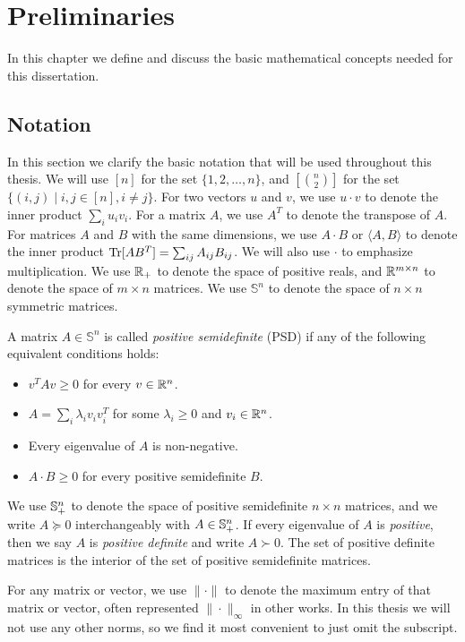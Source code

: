 \chapter{Preliminaries}\label{cha:prelims}
In this chapter we define and discuss the basic mathematical concepts needed for this dissertation.

\section{Notation}
In this section we clarify the basic notation that will be used throughout this thesis. We will use $[n]$ for the set $\{1,2,\dots,n\}$, and $[\binom{n}{2}]$ for the set $\{(i,j) \mid i,j \in [n], i \neq j\}$. For two vectors $u$ and $v$, we use $u \cdot v$ to denote the inner product $\sum_i u_i v_i$. For a matrix $A$, we use $A^T$ to denote the transpose of $A$. For matrices $A$ and $B$ with the same dimensions, we use $A \cdot B$ or $\langle A,B \rangle$ to denote the inner product $\operatorname{Tr}[AB^T] = \sum_{ij} A_{ij}B_{ij}$. We will also use $\cdot$ to emphasize multiplication. We use $\mathbb R_+$ to denote the space of positive reals, and $\mathbb R^{m \times n}$ to denote the space of $m \times n$ matrices. We use $\mathbb{S}^{n}$ to denote the space of $n \times n$ symmetric matrices.
\begin{definition}
A matrix $A \in \mathbb{S}^{n}$ is called \emph{positive semidefinite} (PSD) if any of the following equivalent conditions holds:
\begin{itemize}
\item $v^TAv \geq 0$ for every $v \in \mathbb R^n$.
\item $A = \sum_i \lambda_i v_iv_i^T$ for some $\lambda_i \geq 0$ and $v_i \in \mathbb R^n$.
\item Every eigenvalue of $A$ is non-negative.
\item $A \cdot B \geq 0$ for every positive semidefinite $B$.
\end{itemize}
\end{definition}
We use $\mathbb{S}^{n}_+$ to denote the space of positive semidefinite $n \times n$ matrices, and we write $A \succeq 0$ interchangeably with $A \in \mathbb{S}^{n}_+$. If every eigenvalue of $A$ is \emph{positive}, then we say $A$ is \emph{positive definite} and write $A \succ 0$. The set of positive definite matrices is the interior of the set of positive semidefinite matrices.

For any matrix or vector, we use $\|\cdot\|$ to denote the maximum entry of that matrix or vector, often represented $\|\cdot\|_\infty$ in other works. In this thesis we will not use any other norms, so we find it most convenient to just omit the subscript.

